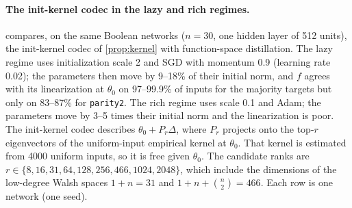

\paragraph{The init-kernel codec in the lazy and rich regimes.}  compares, on the same Boolean networks ($n=30$, one hidden layer of 512 units), the init-kernel codec of \cref{prop:kernel} with function-space distillation. The lazy regime uses initialization scale 2 and SGD with momentum 0.9 (learning rate 0.02); the parameters then move by 9--18\% of their initial norm, and $f$ agrees with its linearization at $\theta_0$ on 97--99.9\% of inputs for the majority targets but only on 83--87\% for \texttt{parity2}. The rich regime uses scale 0.1 and Adam; the parameters move by 3--5 times their initial norm and the linearization is poor. The init-kernel codec describes $\theta_0+P_r\Delta$, where $P_r$ projects onto the top-$r$ eigenvectors of the uniform-input empirical kernel at $\theta_0$. That kernel is estimated from 4000 uniform inputs, so it is free given $\theta_0$. The candidate ranks are $r\in\{8,16,31,64,128,256,466,1024,2048\}$, which include the dimensions of the low-degree Walsh spaces $1+n=31$ and $1+n+\binom n2=466$. Each row is one network (one seed).

